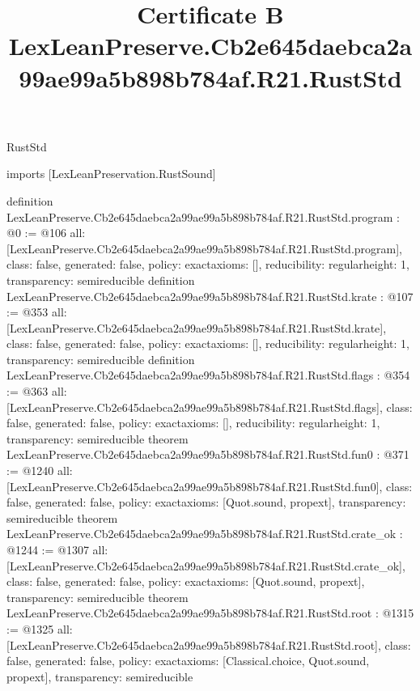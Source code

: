 \begin{lexlean}{RustStd}
\title{Certificate B LexLeanPreserve.Cb2e645daebca2a99ae99a5b898b784af.R21.RustStd}
\begin{coremodule}
imports [LexLeanPreservation.RustSound]

definition LexLeanPreserve.Cb2e645daebca2a99ae99a5b898b784af.R21.RustStd.program : @0 := @106 {
  all: [LexLeanPreserve.Cb2e645daebca2a99ae99a5b898b784af.R21.RustStd.program],
  class: false,
  generated: false,
  policy: exact{axioms: []},
  reducibility: regular{height: 1},
  transparency: semireducible
}
definition LexLeanPreserve.Cb2e645daebca2a99ae99a5b898b784af.R21.RustStd.krate : @107 := @353 {
  all: [LexLeanPreserve.Cb2e645daebca2a99ae99a5b898b784af.R21.RustStd.krate],
  class: false,
  generated: false,
  policy: exact{axioms: []},
  reducibility: regular{height: 1},
  transparency: semireducible
}
definition LexLeanPreserve.Cb2e645daebca2a99ae99a5b898b784af.R21.RustStd.flags : @354 := @363 {
  all: [LexLeanPreserve.Cb2e645daebca2a99ae99a5b898b784af.R21.RustStd.flags],
  class: false,
  generated: false,
  policy: exact{axioms: []},
  reducibility: regular{height: 1},
  transparency: semireducible
}
theorem LexLeanPreserve.Cb2e645daebca2a99ae99a5b898b784af.R21.RustStd.fun0 : @371 := @1240 {
  all: [LexLeanPreserve.Cb2e645daebca2a99ae99a5b898b784af.R21.RustStd.fun0],
  class: false,
  generated: false,
  policy: exact{axioms: [Quot.sound, propext]},
  transparency: semireducible
}
theorem LexLeanPreserve.Cb2e645daebca2a99ae99a5b898b784af.R21.RustStd.crate_ok : @1244 := @1307 {
  all: [LexLeanPreserve.Cb2e645daebca2a99ae99a5b898b784af.R21.RustStd.crate_ok],
  class: false,
  generated: false,
  policy: exact{axioms: [Quot.sound, propext]},
  transparency: semireducible
}
theorem LexLeanPreserve.Cb2e645daebca2a99ae99a5b898b784af.R21.RustStd.root : @1315 := @1325 {
  all: [LexLeanPreserve.Cb2e645daebca2a99ae99a5b898b784af.R21.RustStd.root],
  class: false,
  generated: false,
  policy: exact{axioms: [Classical.choice, Quot.sound, propext]},
  transparency: semireducible
}


\end{coremodule}
\end{lexlean}
